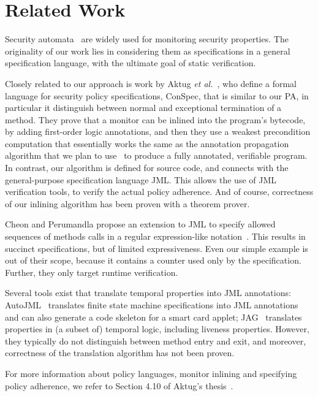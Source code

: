 \section{Related Work}\label{SecRelated}

Security automata~\cite{Schneider99} are widely used for monitoring
security properties. The originality of our work lies in considering
them as specifications in a general specification language, with the
ultimate goal of static verification.

Closely related to our approach is work by Aktug \emph{et
al.}~\cite{Aktug07,Aktug08,AktugDG08}, who define a formal language
for security policy specifications, ConSpec, that is similar to our PA,
in particular it distinguish between normal and exceptional
termination of a method. They prove that a monitor can be inlined into
the program's bytecode, by adding first-order logic annotations, and
then they use a weakest precondition computation that essentially
works the same as the annotation propagation algorithm that we plan to
use~\cite{PavlovaBBHL03} to produce a fully annotated, verifiable
program. In contrast, our algorithm is defined for source code, and
connects with the general-purpose specification language JML. This
allows the use of JML verification tools, to verify the actual policy
adherence. And of course, correctness of our inlining algorithm has
been proven with a theorem prover.

Cheon and Perumandla propose an extension to JML to specify allowed
sequences of methods calls in a regular expression-like
notation~\cite{Cheon07}.  This results in succinct specifications, but
of limited expressiveness. Even our simple example is out of their
scope, because it contains a counter used only by the
specification. Further, they only target runtime verification.

Several tools exist that translate temporal properties into JML
annotations: AutoJML~\cite{Hubbers03} translates finite state machine
specifications into JML annotations and can also generate a code
skeleton for a smart card applet; JAG~\cite{Giorgetti06} translates
properties in (a subset of) temporal logic, including liveness
properties.  However, they typically do not distinguish between method
entry and exit, and moreover, correctness of the translation algorithm
has not been proven.

For more information about policy languages, monitor inlining and
specifying policy adherence, we refer to Section 4.10 of Aktug's
thesis~\cite{Aktug08}.
